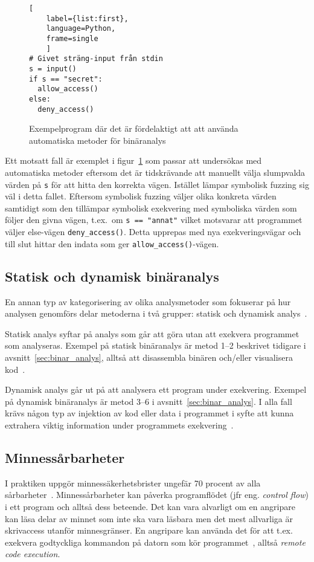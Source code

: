 \begin{figure}
    \begin{lstlisting}[
    label={list:first},
    language=Python,
    frame=single
    ]
# Givet sträng-input från stdin
s = input()
if s == "secret":
  allow_access()
else:
  deny_access()
\end{lstlisting}
    \caption{Exempelprogram där det är fördelaktigt att att använda automatiska metoder för binäranalys}
    \label{fig:automatic_method_example}
\end{figure}

Ett motsatt fall är exemplet i figur~\ref{fig:automatic_method_example} som passar
att undersökas med automatiska metoder eftersom det är tidskrävande
att manuellt välja slumpvalda värden på \texttt{s} för att hitta den korrekta
vägen. Istället lämpar symbolisk fuzzing sig väl i detta fallet. Eftersom
symbolisk fuzzing väljer olika konkreta värden samtidigt som den tillämpar
symbolisk exekvering med symboliska värden som följer den givna vägen, t.ex.\
om \lstinline{s == "annat"} vilket motsvarar att programmet väljer else-vägen
\lstinline{deny_access()}. Detta upprepas med nya exekveringsvägar och till slut
hittar den indata som ger \lstinline{allow_access()}-vägen.


\subsection{Statisk och dynamisk binäranalys}
En annan typ av kategorisering av olika analysmetoder som fokuserar på hur
analysen genomförs delar metoderna i två grupper: statisk och dynamisk
analys~\cite{dynamic_bin_analysis}.

Statisk analys syftar på analys som går att göra utan att exekvera programmet
som analyseras. Exempel på statisk binäranalys är metod 1--2 beskrivet tidigare
i avsnitt~\ref{sec:binar_analys}, alltså att disassembla binären och/eller
visualisera kod~\cite{dynamic_bin_analysis}.

Dynamisk analys går ut på att analysera ett program under
exekvering. Exempel på dynamisk binäranalys är metod 3--6 i
avsnitt~\ref{sec:binar_analys}. I alla fall krävs någon typ av injektion av kod
eller data i programmet i syfte att kunna extrahera viktig information under
programmets exekvering~\cite{dynamic_bin_analysis}.


\subsection{Minnessårbarheter}
I praktiken uppgör minnessäkerhetsbrister ungefär 70 procent av alla
sårbarheter~\cite{miller19}. Minnessårbarheter kan påverka programflödet (jfr
eng. \emph{control flow}) i ett program och alltså dess beteende. Det kan
vara alvarligt om en angripare kan läsa delar av minnet som inte ska vara
läsbara men det mest allvarliga är skrivaccess utanför minnesgränser. En
angripare kan använda det för att t.ex. exekvera godtyckliga kommandon på
datorn som kör programmet~\cite{computer_security_cs161}, alltså \emph{remote
    code execution}.

